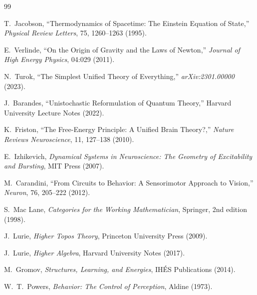 \documentclass[12pt]{article}
\begin{document}
\begin{thebibliography}{99}


T.~Jacobson,
``Thermodynamics of Spacetime: The Einstein Equation of State,''
\textit{Physical Review Letters}, 75, 1260–1263 (1995).

E.~Verlinde,
``On the Origin of Gravity and the Laws of Newton,''
\textit{Journal of High Energy Physics}, 04:029 (2011).

N.~Turok,
``The Simplest Unified Theory of Everything,''
\textit{arXiv:2301.00000} (2023).

J.~Barandes,
``Unistochastic Reformulation of Quantum Theory,''
Harvard University Lecture Notes (2022).


K.~Friston,
``The Free-Energy Principle: A Unified Brain Theory?,''
\textit{Nature Reviews Neuroscience}, 11, 127–138 (2010).

E.~Izhikevich,
\textit{Dynamical Systems in Neuroscience: The Geometry of Excitability and Bursting},
MIT Press (2007).

M.~Carandini,
``From Circuits to Behavior: A Sensorimotor Approach to Vision,''
\textit{Neuron}, 76, 205–222 (2012).


S.~Mac Lane,
\textit{Categories for the Working Mathematician},
Springer, 2nd edition (1998).

J.~Lurie,
\textit{Higher Topos Theory},
Princeton University Press (2009).

J.~Lurie,
\textit{Higher Algebra},
Harvard University Notes (2017).

M.~Gromov,
\textit{Structures, Learning, and Energies},
IHÉS Publications (2014).


W.~T.~Powers,
\textit{Behavior: The Control of Perception},
Aldine (1973).


\end{thebibliography}
\end{document}

